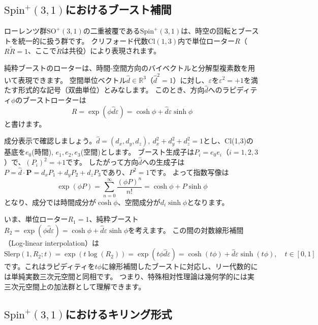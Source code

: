\documentclass[a4paper,12pt,notitlepage]{jsreport}
\begin{document}
\subsection{$ \mathrm{Spin}^+(3,1) $におけるブースト補間}

ローレンツ群$ \mathrm{SO}^+(3,1) $の二重被覆である$ \mathrm{Spin}^+(3,1) $は、時空の回転とブーストを統一的に扱う群です。
クリフォード代数$ \mathrm{Cl}(1,3) $内で単位ローター$R$（$R \tilde{R} = 1$、ここで$\tilde{R}$は共役）により表現されます。

純粋ブーストのローターは、時間-空間方向のバイベクトルと分解型複素数を用いて表現できます。
空間単位ベクトル$\hat{d} \in \mathbb{R}^3$（$\hat{d}^2 = 1$）に対し、$\varepsilon$を$\varepsilon^2 = +1$を満たす形式的な記号（双曲単位）とみなします。
このとき、方向$\hat{d}$へのラピディティ$\phi$のブーストローターは
\begin{equation}
  R = \exp(\phi \hat{d} \varepsilon) = \cosh\phi + \hat{d} \varepsilon \sinh\phi
\end{equation}
と書けます。

成分表示で確認しましょう。$\hat{d} = (d_x, d_y, d_z), ~ d_x^2 + d_y^2 + d_z^2 = 1$とし、Cl(1,3)の基底を$e_0$(時間), $e_1, e_2, e_3$(空間)とします。
ブースト生成子は$P_i = e_0 e_i$（$i=1,2,3$）で、$(P_i)^2 = +1$です。
したがって方向$\hat{d}$への生成子は$P = \hat{d} \cdot \boldsymbol{P} = d_x P_1 + d_y P_2 + d_z P_3$であり、$P^2 = 1$です。
よって指数写像は
\begin{equation}
  \exp(\phi P) = \sum_{n=0}^\infty \frac{(\phi P)^n}{n!} = \cosh\phi + P \sinh\phi
\end{equation}
となり、成分では時間成分が$\cosh\phi$、空間成分が$d_i \sinh\phi$となります。

いま、単位ローター$R_1 = 1$、純粋ブースト$R_2 = \exp(\phi \hat{d} \varepsilon) = \cosh\phi + \hat{d} \varepsilon \sinh\phi$を考えます。
この間の対数線形補間（Log-linear interpolation）は
\begin{equation}
  \mathrm{Slerp}(1, R_2; t) = \exp\left( t \log(R_2) \right) = \exp(t \phi \hat{d} \varepsilon)
  = \cosh(t\phi) + \hat{d} \varepsilon \sinh(t\phi), \quad t \in [0,1]
\end{equation}
です。これはラピディティを$t\phi$に線形補間したブーストに対応し、リー代数的には単純実数三次元空間と同相です。
つまり、特殊相対性理論は幾何学的には実三次元空間上の加法群として理解できます。

\subsection{$ \mathrm{Spin}^+(3,1) $におけるキリング形式}
\end{document}
